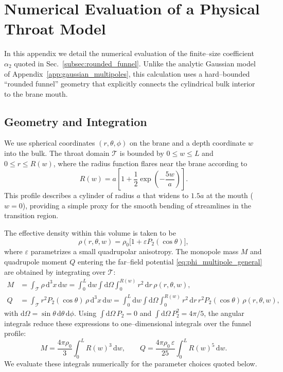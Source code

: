 \documentclass[12pt]{article}
\begin{document}
\section{Numerical Evaluation of a Physical Throat Model}
\label{app:physical_throat}

In this appendix we detail the numerical evaluation of the finite--size coefficient $\alpha_2$ quoted in
Sec.~\ref{subsec:rounded_funnel}.  Unlike the analytic Gaussian model of Appendix~\ref{app:gaussian_multipoles},
this calculation uses a hard--bounded ``rounded funnel'' geometry that explicitly connects the cylindrical bulk
interior to the brane mouth.

\subsection{Geometry and Integration}

We use spherical coordinates $(r,\theta,\phi)$ on the brane and a depth coordinate $w$ into the bulk.  The throat
domain $\mathcal{T}$ is bounded by $0\le w\le L$ and $0\le r\le R(w)$, where the radius function flares near the
brane according to
\begin{equation}
  R(w) = a\left[1+\frac{1}{2}\exp\!\left(-\frac{5w}{a}\right)\right].
\end{equation}
This profile describes a cylinder of radius $a$ that widens to $1.5a$ at the mouth ($w=0$), providing a simple
proxy for the smooth bending of streamlines in the transition region.

The effective density within this volume is taken to be
\begin{equation}
  \rho(r,\theta,w) = \rho_0\big[1+\varepsilon P_2(\cos\theta)\big],
\end{equation}
where $\varepsilon$ parametrizes a small quadrupolar anisotropy.  The monopole mass $M$ and quadrupole moment $Q$
entering the far--field potential \eqref{eq:phi_multipole_general} are obtained by integrating over $\mathcal{T}$:
\begin{align}
  M &= \int_{\mathcal{T}} \rho\,\mathrm{d}^3x\,\mathrm{d}w
     = \int_0^L \mathrm{d}w \int \mathrm{d}\Omega \int_0^{R(w)} r^2\,\mathrm{d}r \,\rho(r,\theta,w), \\
  Q &= \int_{\mathcal{T}} r^2 P_2(\cos\theta)\,\rho\,\mathrm{d}^3x\,\mathrm{d}w
     = \int_0^L \mathrm{d}w \int \mathrm{d}\Omega \int_0^{R(w)} r^2\,\mathrm{d}r \, r^2 P_2(\cos\theta)\,\rho(r,\theta,w),
\end{align}
with $\mathrm{d}\Omega=\sin\theta\,\mathrm{d}\theta\,\mathrm{d}\phi$.  Using $\int \mathrm{d}\Omega\,P_2=0$ and
$\int \mathrm{d}\Omega\,P_2^2 = 4\pi/5$, the angular integrals reduce these expressions to one--dimensional
integrals over the funnel profile:
\begin{equation}
  M = \frac{4\pi\rho_0}{3}\int_0^L R(w)^3\,\mathrm{d}w,
  \qquad
  Q = \frac{4\pi\rho_0\,\varepsilon}{25}\int_0^L R(w)^5\,\mathrm{d}w.
\end{equation}
We evaluate these integrals numerically for the parameter choices quoted below.
\end{document}
